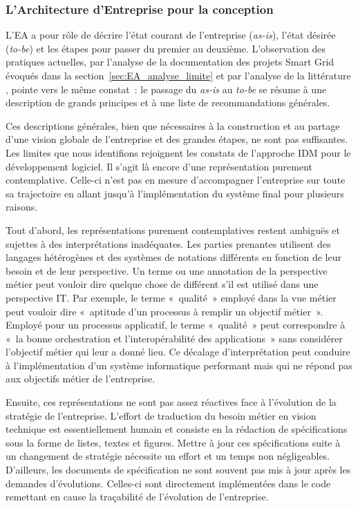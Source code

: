         \subsubsection{L'Architecture d'Entreprise pour la conception}

 L'EA a pour rôle de décrire l'état courant de l'entreprise (\textit{as-is}),
l'état désirée (\textit{to-be}) et les étapes pour passer du premier au
deuxième. L'observation des pratiques actuelles, par l'analyse de la
documentation des projets Smart Grid évoqués dans la
section~\ref{sec:EA_analyse_limite} et par l'analyse de la littérature , pointe
vers le même constat~: le passage du \textit{as-is} au \textit{to-be} se résume
à une description de grands principes et à une liste de recommandations
générales.

 Ces descriptions générales, bien que nécessaires à la construction et au
partage d'une vision globale de l'entreprise et des grandes étapes, ne sont pas
suffisantes. Les limites que nous identifions rejoignent les constats de
l'approche IDM pour le développement logiciel. Il s'agit là encore d'une
représentation purement contemplative. Celle-ci n'est pas en mesure
d'accompagner l'entreprise sur toute sa trajectoire en allant jusqu'à
l'implémentation du système final pour plusieurs raisons.

 Tout d'abord, les représentations purement contemplatives restent ambiguës
et sujettes à des interprétations inadéquates. Les parties prenantes utilisent
des langages hétérogènes et des systèmes de notations différents en fonction de
leur besoin et de leur perspective. Un terme ou une annotation de la
perspective métier peut vouloir dire quelque chose de différent s'il est
utilisé dans une perspective IT. Par exemple, le terme «~qualité~» employé dans
la vue métier peut vouloir dire «~aptitude d'un processus à remplir un objectif
métier~». Employé pour un processus applicatif, le terme «~qualité~» peut
correspondre à «~la bonne orchestration et l'interopérabilité des
applications~» sans considérer l'objectif métier qui leur a donné lieu. Ce
décalage d'interprétation peut conduire à l'implémentation d'un système
informatique performant mais qui ne répond pas aux objectifs métier de
l'entreprise.

Ensuite, ces représentations ne sont pas assez réactives face à l'évolution
de la stratégie de l'entreprise. L'effort de traduction du besoin métier en
vision technique est essentiellement humain et consiste en la rédaction de
spécifications sous la forme de listes, textes et figures. Mettre à jour ces
spécifications suite à un changement de stratégie nécessite un effort et un
temps non négligeables. D'ailleurs, les documents de spécification ne sont
souvent pas mis à jour après les demandes d'évolutions. Celles-ci sont
directement implémentées dans le code remettant en cause la traçabilité de
l'évolution de l'entreprise.

